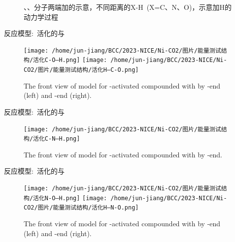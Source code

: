 \begin{frame}[allowframebreaks]
\begin{figure}[h!]
\caption{\tiny{\textrm{、、}分子两端加\textrm{}的示意，不同距离的\textrm{X-H~(X=C、N、O)}，示意加\textrm{H}的动力学过程}}
\label{Molecules}
\end{figure}
反应模型:~活化的\textrm{}与\textrm{}
\begin{figure}[h!]
\centering
\texttt{[image: /home/jun-jiang/BCC/2023-NICE/Ni-CO2/图片/能量测试结构/活化C-O---H.png]}
\texttt{[image: /home/jun-jiang/BCC/2023-NICE/Ni-CO2/图片/能量测试结构/活化H---C-O.png]}
\caption{\tiny \textrm{The front view of model for -activated compounded with  by -end (left) and -end (right).}}%
\label{Model:CO-H}
\end{figure}
反应模型:~活化的\textrm{}与\textrm{}
\begin{figure}[h!]
\centering
\texttt{[image: /home/jun-jiang/BCC/2023-NICE/Ni-CO2/图片/能量测试结构/活化C-N---H.png]}
\caption{\tiny \textrm{The front view of model for -activated compounded with  by -end.}}%
\label{Model:CN-H}
\end{figure}
反应模型:~活化的\textrm{}与\textrm{}
\begin{figure}[h!]
\centering
\texttt{[image: /home/jun-jiang/BCC/2023-NICE/Ni-CO2/图片/能量测试结构/活化N-O---H.png]}
\texttt{[image: /home/jun-jiang/BCC/2023-NICE/Ni-CO2/图片/能量测试结构/活化H---N-O.png]}
\caption{\tiny \textrm{The front view of model for -activated compounded with  by -end (left) and -end (right).}}%
\label{Model:NO-H}
\end{figure}


\end{frame}
